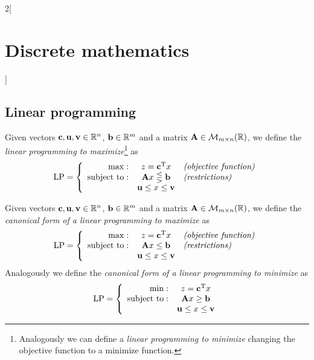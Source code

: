 \documentclass[../../../main.tex]{subfiles}
\begin{document}
\begin{multicols}{2}[\section{Discrete mathematics}]
    \subsection{Linear programming}
    \begin{definition}
        Given vectors $\vb{c},\vb{u},\vb{v}\in\mathbb{R} ^n$, $\vb{b}\in\mathbb{R} ^m$ and a matrix $\vb{A}\in\mathcal{M}_{m\times n}(\mathbb{R} )$, we define the \textit{linear programming to maximize}\footnote{Analogously we can define a \textit{linear programming to minimize} changing the objective function to a minimize function.} as $$\text{LP}=\left\{\begin{array}{rcl}
                \max:              & z=\vb{c}^{\mathrm{T}}x                       & \textit{(objective function)} \\
                \text{subject to}: & \vb{A}x\lesseqgtr \vb{b} & \textit{(restrictions)}       \\
                                   & \vb{u}\leq x\leq \vb{v}  &
            \end{array}\right.$$
    \end{definition}
    \begin{definition}
        Given vectors $\vb{c},\vb{u},\vb{v}\in\mathbb{R} ^n$, $\vb{b}\in\mathbb{R} ^m$ and a matrix $\vb{A}\in\mathcal{M}_{m\times n}(\mathbb{R} )$, we define the \textit{canonical form of a linear programming to maximize} as $$\text{LP}=\left\{\begin{array}{rcl}
                \max:              & z=\vb{c}^{\mathrm{T}}x                      & \textit{(objective function)} \\
                \text{subject to}: & \vb{A}x\leq \vb{b}      & \textit{(restrictions)}       \\
                                   & \vb{u}\leq x\leq \vb{v} &
            \end{array}\right.$$
        Analogously we define the \textit{canonical form of a linear programming to minimize} as $$\text{LP}=\left\{\begin{array}{rc}
                \min:              & z=\vb{c}^{\mathrm{T}}x                      \\
                \text{subject to}: & \vb{A}x\geq \vb{b}      \\
                                   & \vb{u}\leq x\leq \vb{v}
            \end{array}\right.$$
    \end{definition}

\end{multicols}
\end{document}
